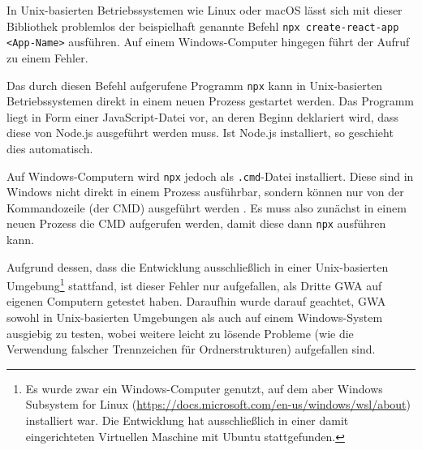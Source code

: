In Unix-basierten Betriebssystemen wie Linux oder macOS lässt sich mit dieser Bibliothek problemlos der beispielhaft genannte Befehl \verb/npx create-react-app <App-Name>/ ausführen. Auf einem Windows-Computer hingegen führt der Aufruf zu einem Fehler.

Das durch diesen Befehl aufgerufene Programm \verb/npx/ kann in Unix-basierten Betriebssystemen direkt in einem neuen Prozess gestartet werden. Das Programm liegt in Form einer JavaScript-Datei vor, an deren Beginn deklariert wird, dass diese von Node.js ausgeführt werden muss. Ist Node.js installiert, so geschieht dies automatisch.

Auf Windows-Computern wird \verb/npx/ jedoch als \verb/.cmd/-Datei installiert. Diese sind in Windows nicht direkt in einem Prozess ausführbar, sondern können nur von der Kommandozeile (der CMD) ausgeführt werden \cite{windows_spawn_cmd}. Es muss also zunächst in einem neuen Prozess die CMD aufgerufen werden, damit diese dann \verb/npx/ ausführen kann.

Aufgrund dessen, dass die Entwicklung ausschließlich in einer Unix-basierten Umgebung\footnote{Es wurde zwar ein Windows-Computer genutzt, auf dem aber Windows Subsystem for Linux (\url{https://docs.microsoft.com/en-us/windows/wsl/about}) installiert war. Die Entwicklung hat ausschließlich in einer damit eingerichteten Virtuellen Maschine mit Ubuntu stattgefunden.} stattfand, ist dieser Fehler nur aufgefallen, als Dritte \gls{GWA} auf eigenen Computern getestet haben. Daraufhin wurde darauf geachtet, \gls{GWA} sowohl in Unix-basierten Umgebungen als auch auf einem Windows-System ausgiebig zu testen, wobei weitere leicht zu lösende Probleme (wie die Verwendung falscher Trennzeichen für Ordnerstrukturen) aufgefallen sind.

